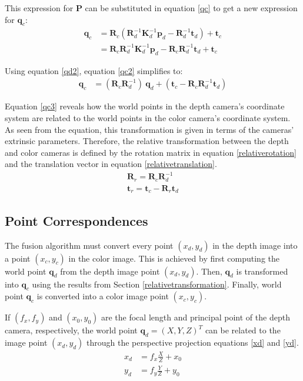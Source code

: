 This expression for $\mathbf{P}$ can be substituted in equation \eqref{qc} to get a new expression for 
$\mathbf{q}_c$:
\begin{align}
	\mathbf{q}_c &= \mathbf{R}_c (\mathbf{R}_{d}^{-1} \mathbf{K}_{d}^{-1} \mathbf{p}_d 
					- \mathbf{R}_{d}^{-1} \mathbf{t}_d  ) + \mathbf{t}_c \nonumber \\
			    & =  \mathbf{R}_c \mathbf{R}_{d}^{-1} \mathbf{K}_{d}^{-1} \mathbf{p}_d
			    		 - \mathbf{R}_c \mathbf{R}_{d}^{-1} \mathbf{t}_d + \mathbf{t}_c \label{qc2}
\end{align}

Using equation \eqref{qd2}, equation \eqref{qc2} simplifies to:
\begin{align}
	\mathbf{q}_c &=  (\mathbf{R}_c \mathbf{R}_{d}^{-1}) ~ \mathbf{q}_{d}  
		+ (\mathbf{t}_c - \mathbf{R}_c \mathbf{R}_{d}^{-1} \mathbf{t}_d) \label{qc3}
\end{align}

Equation \eqref{qc3} reveals how the world points in the depth camera's coordinate system are related to 
the world points in the color camera's coordinate system. As seen from the equation, this
transformation is given in terms of the cameras' extrinsic parameters. Therefore, the relative transformation
between the depth and color cameras is defined by the rotation matrix in equation \eqref{relativerotation}
and the translation vector in equation \eqref{relativetranslation}.
\begin{align}
	\mathbf{R}_r = \mathbf{R}_c \mathbf{R}_{d}^{-1} \label{relativerotation} \\
	\mathbf{t}_r = \mathbf{t}_c - \mathbf{R}_r \mathbf{t}_d \label{relativetranslation}
\end{align}


\subsection{Point Correspondences} \label{pointcorrespondences}


The fusion algorithm must convert every point $(x_d, y_d)$ in the depth image into a point $(x_c, y_c)$ in 
the color image. This is achieved by first computing the world point $\mathbf{q}_d$ from the depth image
point $(x_d, y_d)$. Then, $\mathbf{q}_d$ is transformed into $\mathbf{q}_c$ using the results from Section 
\ref{relativetransformation}. Finally, world point $\mathbf{q}_c$ is converted into a color image point 
$(x_c, y_c)$.

If $(f_x, f_y)$ and $(x_0, y_0)$ are the focal length and principal point of the depth camera, respectively, 
the world point $\mathbf{q}_d = (X, Y, Z)^T$ can be related to the image point $(x_d, y_d)$ through the 
perspective projection equations \eqref{xd} and \eqref{yd}. 
\begin{align}
	x_d &= f_x \frac{X}{Z} + x_0 \label{xd} \\
	y_d &= f_y \frac{Y}{Z} + y_0 \label{yd} 
\end{align}
	
